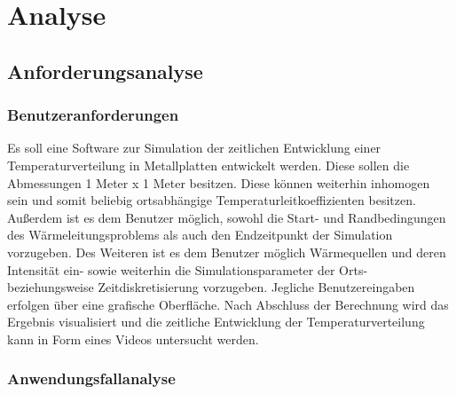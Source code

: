 \chapter{Analyse}
\section{Anforderungsanalyse}

\subsection{Benutzeranforderungen}

Es soll eine Software zur Simulation der zeitlichen Entwicklung einer Temperaturverteilung in Metallplatten entwickelt werden. Diese sollen die Abmessungen 1 Meter x 1 Meter besitzen. Diese können weiterhin inhomogen sein und somit beliebig ortsabhängige Temperaturleitkoeffizienten besitzen. Außerdem ist es dem Benutzer möglich, sowohl die Start- und Randbedingungen des Wärmeleitungsproblems als auch den Endzeitpunkt der Simulation vorzugeben. Des Weiteren ist es dem Benutzer möglich Wärmequellen und deren Intensität ein- sowie weiterhin die Simulationsparameter der Orts- beziehungsweise Zeitdiskretisierung vorzugeben. Jegliche Benutzereingaben erfolgen über eine grafische Oberfläche. Nach Abschluss der Berechnung wird das Ergebnis visualisiert und die zeitliche Entwicklung der Temperaturverteilung kann in Form eines Videos untersucht werden.


\subsection{Anwendungsfallanalyse} \label{Kapitel Use Case Analyse}

